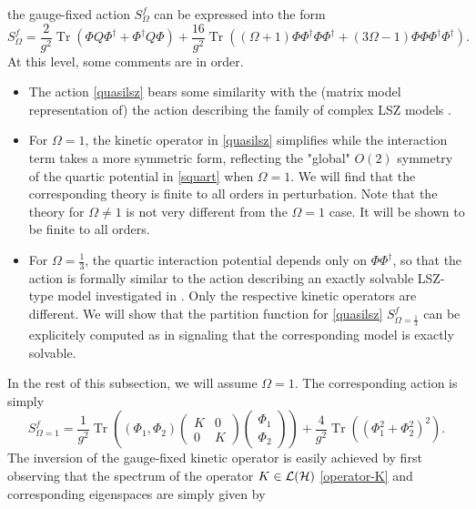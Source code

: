 \documentclass[a4paper,11pt,twoside]{article}
\numberwithin{equation}{section}
\DeclareMathOperator{\tr}{Tr}
\theoremstyle{nonumberplain}
\newcounter{and}
\begin{document}
%
the gauge-fixed action $S^f_\Omega$ can be expressed into the form%
%
\begin{equation}
S^f_\Omega = \frac{2}{g^2} \tr\left( \Phi Q \Phi^\dag + \Phi^\dag Q\Phi \right) + \frac{16}{g^2} \tr\left( (\Omega+1) \Phi\Phi^\dag\Phi\Phi^\dag + (3\Omega-1) \Phi\Phi\Phi^\dag\Phi^\dag \right) .
\label{quasilsz}
\end{equation}
%
At this level, some comments are in order.
\begin{itemize}
%
\item The action \eqref{quasilsz} bears some similarity with the (matrix model representation of) the action describing the family of complex LSZ models \cite{LSZ}.%
%
\item For $\Omega=1$, the kinetic operator in \eqref{quasilsz} simplifies while the interaction term takes a more symmetric form, reflecting the "global" $O(2)$ symmetry of the quartic potential in \eqref{squart} when $\Omega=1$. We will find that the corresponding theory is finite to all orders in perturbation. Note that the theory for $\Omega\ne 1$ is not very different from the $\Omega=1$ case. It will be shown to be finite to all orders.%
%
\item For $\Omega=\frac13$, the quartic interaction potential depends only on $\Phi\Phi^\dag$, so that the action is formally similar to the action describing an exactly solvable LSZ-type model investigated in \cite{LSZ}. Only the respective kinetic operators are different. We will show that the partition function for \eqref{quasilsz} $S^f_{\Omega=\frac{1}{3}}$ can be explicitely computed as in \cite{LSZ} signaling that the corresponding model is exactly solvable.%
%
\end{itemize}
%
In the rest of this subsection, we will assume $\Omega=1$. The corresponding action is simply%
%
\begin{equation}
S^f_{\Omega=1} = \frac{1}{g^2} \tr\left( (\Phi_1,\Phi_2)
\begin{pmatrix}
K&0\\
0&K
\end{pmatrix} 
\begin{pmatrix}
\Phi_1\\
\Phi_2
\end{pmatrix} 
\right)
+ \frac{4}{g^2} \tr\left( (\Phi_1^2 + \Phi_2^2)^2 \right) . \label{critical-action}
\end{equation}
%
The inversion of the gauge-fixed kinetic operator is easily achieved by first observing that the spectrum of the operator $K\in{\cal{L}}({\cal{H}})$ \eqref{operator-K} and corresponding eigenspaces are simply given by%
\end{document}
